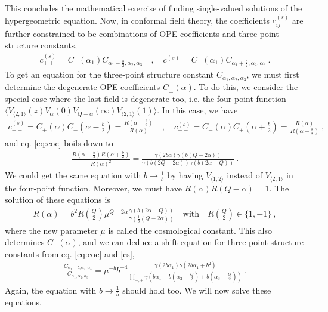\documentclass[12pt, a4paper]{article}
\theoremstyle{break}
\begin{document}
This concludes the mathematical exercise of finding single-valued solutions of the hypergeometric equation. 
Now, in conformal field theory, the coefficients $c^{(s)}_{ij}$ are further constrained to be combinations of OPE coefficients and three-point structure constants, 
\begin{align}
 c_{++}^{(s)} = C_+(\alpha_1) C_{\alpha_1-\frac{b}{2},\alpha_2,\alpha_3} 
\quad , \quad 
c_{--}^{(s)}  = C_-(\alpha_1) C_{\alpha_1+\frac{b}{2},\alpha_2,\alpha_3}\ .
\label{cs}
\end{align}
To get an equation for the three-point structure constant $C_{\alpha_1,\alpha_2,\alpha_3}$, we must first determine the degenerate OPE coefficients $C_\pm(\alpha)$. To do this, we consider the special case where the last field is degenerate too, i.e. the four-point function $\Big\langle V_{\langle 2,1 \rangle}(z) V_\alpha(0) V_{Q-\alpha}(\infty) V_{\langle 2,1 \rangle}(1)\Big\rangle$.
In this case, we have
\begin{align}
 c_{++}^{(s)} = C_+(\alpha)C_-(\alpha-\tfrac{b}{2}) = \frac{R(\alpha-\frac{b}{2})}{R(\alpha)} \quad , \quad c_{--}^{(s)} = C_-(\alpha)C_+(\alpha+\tfrac{b}{2}) = \frac{R(\alpha)}{R(\alpha+\frac{b}{2})}\ ,
\end{align}
and eq. \eqref{eq:coc} boils down to 
\begin{align}
 \frac{R(\alpha-\frac{b}{2})R(\alpha+\frac{b}{2})}{R(\alpha)^2} 
 = \frac{\gamma(2b\alpha)\gamma(b(Q-2\alpha))}{\gamma(b(2Q-2\alpha))\gamma(b(2\alpha-Q))}\ .
\end{align}
We could get the same equation with $b\to \frac{1}{b}$ by having $V_{\langle 1,2\rangle}$ instead of $V_{\langle 2,1\rangle}$ in the four-point function. Moreover, we must have $R(\alpha)R(Q-\alpha)=1$. The solution of these equations is
\begin{align}
 R(\alpha) = b^2 R(\tfrac{Q}{2}) \mu^{Q-2\alpha} \frac{\gamma(b(2\alpha-Q))}{\gamma(\frac{1}{b}(Q-2\alpha))}\quad \text{with}\quad R(\tfrac{Q}{2}) \in \{1, -1\}\ ,
\end{align}
where the new parameter $\mu$ is called the cosmological constant. 
This also determines $C_\pm(\alpha)$, and we can deduce a shift equation for three-point structure constants from eq. \eqref{eq:coc} and \eqref{cs},
\begin{align}
 \frac{C_{\alpha_1+b,\alpha_2,\alpha_3}}{C_{\alpha_1,\alpha_2,\alpha_3}} = \mu^{-b} b^{-4}\frac{\gamma(2b\alpha_1)\gamma(2b\alpha_1+b^2)}{\prod_{\pm,\pm} \gamma\left(b\alpha_1\pm b(\alpha_2-\frac{Q}{2})\pm b(\alpha_3-\frac{Q}{2})\right)}\ .
\label{fcc}
\end{align}
Again, the equation with $b\to \frac{1}{b}$ should hold too. We will now solve these equations.
\end{document}
